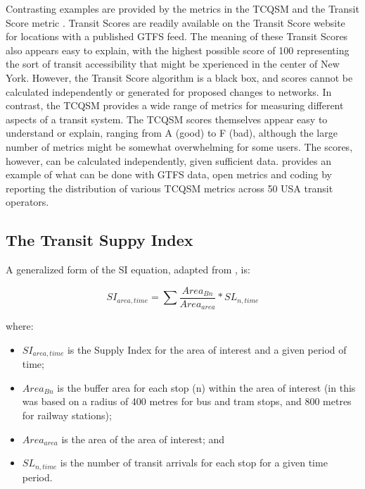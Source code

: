 \documentclass[preprint, 3p,
authoryear]{elsarticle} %
\begin{document}
Contrasting examples are provided by the metrics in the TCQSM and the
Transit Score metric \citep{WalkScore:2023tg}. Transit Scores are
readily available on the Transit Score website for locations with a
published GTFS feed. The meaning of these Transit Scores also appears
easy to explain, with the highest possible score of 100 representing the
sort of transit accessibility that might be xperienced in the center of
New York. However, the Transit Score algorithm is a black box, and
scores cannot be calculated independently or generated for proposed
changes to networks. In contrast, the TCQSM provides a wide range of
metrics for measuring different aspects of a transit system. The TCQSM
scores themselves appear easy to understand or explain, ranging from A
(good) to F (bad), although the large number of metrics might be
somewhat overwhelming for some users. The scores, however, can be
calculated independently, given sufficient data. \citet{Wong:2013aa}
provides an example of what can be done with GTFS data, open metrics and
coding by reporting the distribution of various TCQSM metrics across 50
USA transit operators.

\subsection{The Transit Suppy Index}\label{the-transit-suppy-index}

A generalized form of the SI equation, adapted from
\citet{currie2010identifying}, is:

\[SI_{area, time} = \sum{\frac{Area_{Bn}}{Area_{area}}*SL_{n, time}}\]

where:

\begin{itemize}
\item
  \(SI_{area, time}\) is the Supply Index for the area of interest and a
  given period of time;
\item
  \(Area_{Bn}\) is the buffer area for each stop (n) within the area of
  interest (in \citet{currie2010identifying} this was based on a radius
  of 400 metres for bus and tram stops, and 800 metres for railway
  stations);
\item
  \(Area_{area}\) is the area of the area of interest; and
\item
  \(SL_{n,time}\) is the number of transit arrivals for each stop for a
  given time period.
\end{itemize}
\end{document}

